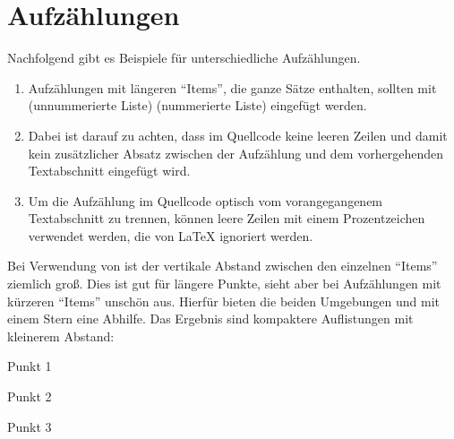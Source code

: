 \section{Aufzählungen}%
%
\label{sec:Aufzählungen}
%
Nachfolgend gibt es Beispiele für unterschiedliche Aufzählungen.
%
\begin{enumerate}
\item \justifying Aufzählungen mit längeren \enquote{Items}, die ganze Sätze enthalten, sollten mit  (unnummerierte Liste) \bzw {} (nummerierte Liste) eingefügt werden.

\item \justifying Dabei ist darauf zu achten, dass im Quellcode keine leeren Zeilen und damit kein zusätzlicher Absatz zwischen der Aufzählung und dem vorhergehenden Textabschnitt eingefügt wird.

\item \justifying Um die Aufzählung im Quellcode optisch vom vorangegangenem Textabschnitt zu trennen, können leere Zeilen mit einem Prozentzeichen verwendet werden, die von \LaTeX{} ignoriert werden.
\end{enumerate}
%
Bei Verwendung von  \bzw {} ist der vertikale Abstand zwischen den einzelnen \enquote{Items} ziemlich groß.
Dies ist gut für längere Punkte, sieht aber bei Aufzählungen mit kürzeren \enquote{Items} unschön aus.
Hierfür bieten die beiden Umgebungen  und  mit einem Stern eine Abhilfe.
Das Ergebnis sind kompaktere Auflistungen mit kleinerem Abstand:
%
\begin{itemize*}
\item Punkt 1
\item Punkt 2
\item Punkt 3
\end{itemize*}
